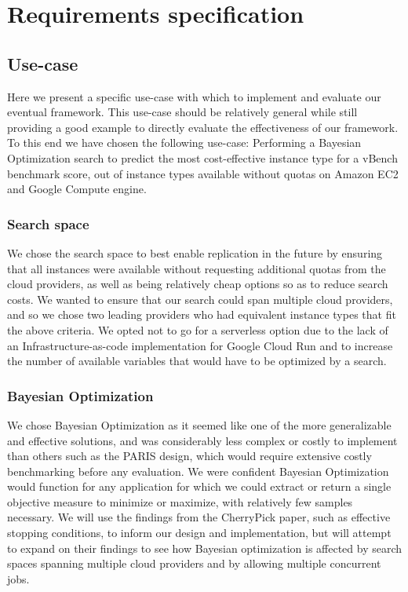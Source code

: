 \documentclass{report}
\begin{document}
\chapter{Requirements specification}
\section{Use-case}
Here we present a specific use-case with which to implement and evaluate our eventual framework. This use-case should be relatively general while still providing a good example to directly evaluate the effectiveness of our framework. To this end we have chosen the following use-case: Performing a Bayesian Optimization search to predict the most cost-effective instance type for a vBench benchmark score, out of instance types available without quotas on Amazon EC2 and Google Compute engine.
\subsection{Search space}
We chose the search space to best enable replication in the future by ensuring that all instances were available without requesting additional quotas from the cloud providers, as well as being relatively cheap options so as to reduce search costs. We wanted to ensure that our search could span multiple cloud providers, and so we chose two leading providers who had equivalent instance types that fit the above criteria. We opted not to go for a serverless option due to the lack of an Infrastructure-as-code implementation for Google Cloud Run and to increase the number of available variables that would have to be optimized by a search.
\subsection{Bayesian Optimization}
We chose Bayesian Optimization as it seemed like one of the more generalizable and effective solutions\cite{Alipourfard2017}, and was considerably less complex or costly to implement than others such as the PARIS design, which would require extensive costly benchmarking before any evaluation\cite{Yadwadkar2017}. We were confident Bayesian Optimization would function for any application for which we could extract or return a single objective measure to minimize or maximize, with relatively few samples necessary. We will use the findings from the CherryPick paper, such as effective stopping conditions, to inform our design and implementation, but will attempt to expand on their findings to see how Bayesian optimization is affected by search spaces spanning multiple cloud providers and by allowing multiple concurrent jobs.
\end{document}
